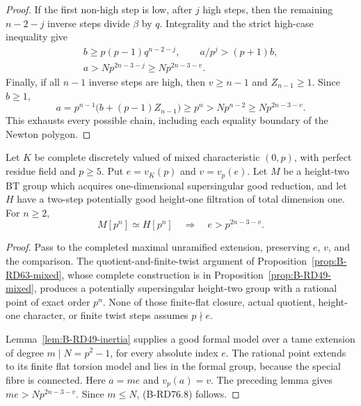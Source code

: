 \begin{proof}
If the first non-high step is low, after \(j\) high steps,
then the remaining \(n-2-j\) inverse steps divide \(\beta\)
by \(q\). Integrality and the strict high-case inequality give
\[
 \begin{gathered}
 b\ge p(p-1)q^{n-2-j},\qquad
 a/p^j>(p+1)b,\\
 a>Np^{2n-3-j}\ge Np^{2n-3-v}.
 \end{gathered}                                    \tag{B-RD76.6}
\]
Finally, if all \(n-1\) inverse steps are high, then
\(v\ge n-1\) and \(Z_{n-1}\ge1\). Since \(b\ge1\),
\[
 a=p^{n-1}\bigl(b+(p-1)Z_{n-1}\bigr)
       \ge p^n>Np^{n-2}\ge Np^{2n-3-v}.
                                                     \tag{B-RD76.7}
\]
This exhausts every possible chain, including each equality
boundary of the Newton polygon.
\end{proof}

\begin{proposition}
\label{prop:B-RD76-mixed}
Let \(K\) be complete discretely valued of mixed characteristic
\((0,p)\), with perfect residue field and \(p\ge5\). Put
\(e=v_K(p)\) and \(v=v_p(e)\). Let \(M\) be a height-two
BT group which acquires one-dimensional supersingular good
reduction, and let \(H\) have a two-step potentially good
height-one filtration of total dimension one. For \(n\ge2\),
\[
 M[p^n]\simeq H[p^n]\quad\Longrightarrow\quad
                     e>p^{2n-3-v}.                 \tag{B-RD76.8}
\]
\end{proposition}
\begin{proof}
Pass to the completed maximal unramified extension, preserving
\(e\), \(v\), and the comparison. The quotient-and-finite-twist
argument of Proposition~\ref{prop:B-RD63-mixed}, whose complete
construction is in Proposition~\ref{prop:B-RD49-mixed}, produces
a potentially supersingular height-two group with a rational
point of exact order \(p^n\). None of those finite-flat closure,
actual quotient, height-one character, or finite twist steps
assumes \(p\nmid e\).

Lemma~\ref{lem:B-RD49-inertia} supplies a good formal model
over a tame extension of degree \(m\mid N=p^2-1\), for every
absolute index \(e\). The rational point extends to its finite
flat torsion model and lies in the formal group, because the
special fibre is connected. Here \(a=me\) and \(v_p(a)=v\).
The preceding lemma gives \(me>Np^{2n-3-v}\). Since
\(m\le N\), (B-RD76.8) follows.
\end{proof}

